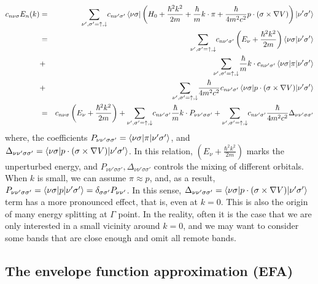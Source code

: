 \documentclass{article}
\begin{document}
\begin{eqnarray*}  c_{n \nu \sigma} E_n (k) & = & \underset{\nu', \sigma' = \uparrow,  \downarrow}{\sum} c_{n \nu' \sigma'} \bra{\nu \sigma} \left( H_0 + \frac{\hbar^2  k^2}{2 m} + \frac{\hbar}{m} k \cdot \pi + \frac{\hbar}{4 m^2 c^2} p \cdot  (\sigma \times \nabla V) \right) \ket{\nu' \sigma'}\\  & = & \underset{\nu', \sigma' = \uparrow, \downarrow}{\sum} c_{n \nu'  \sigma'} \left( E_{\nu} + \frac{\hbar^2 k^2}{2 m} \right) \braket{\nu \sigma |\nu'  \sigma'} \\  & + & \underset{\nu', \sigma' = \uparrow, \downarrow}{\sum} \frac{\hbar}{m}  k \cdot c_{n \nu' \sigma'} \braket{\nu \sigma |\pi|\nu' \sigma'}\\  & + & \underset{\nu', \sigma' = \uparrow, \downarrow}{\sum} \frac{\hbar}{4  m^2 c^2} c_{n \nu' \sigma'} \braket{\nu \sigma |p \cdot (\sigma \times \nabla V)|  \nu' \sigma'}\\  & = & c_{n \nu \sigma} \left( E_{\nu} + \frac{\hbar^2 k^2}{2 m} \right) +  \underset{\nu', \sigma' = \uparrow, \downarrow}{\sum} c_{n \nu' \sigma'}  \frac{\hbar}{m} k \cdot P_{\nu \nu' \sigma \sigma'} + \underset{\nu',  \sigma' = \uparrow, \downarrow}{\sum} c_{n \nu' \sigma'} \frac{\hbar}{4 m^2  c^2} \Delta_{\nu \nu' \sigma \sigma'}\end{eqnarray*}
where, the coefficients $P_{\nu \nu' \sigma \sigma'} = \braket{\nu \sigma |\pi|\nu'\sigma'}$, and $\Delta_{\nu \nu' \sigma \sigma'} = \braket{\nu \sigma |p \cdot (\sigma \times \nabla V)|\nu'\sigma'}$. In this relation, $\left( E_{\nu} + \frac{\hbar^2 k^2}{2 m} \right)$ marks the unperturbed energy, and $P_{\nu \nu' \sigma \sigma'}, \Delta_{\nu \nu' \sigma \sigma'}$ controls the mixing of different orbitals. When $k$ is small, we can assume $\pi\approx p$, and, as a result, $P_{\nu \nu' \sigma \sigma'} = \braket{\nu \sigma |p|\nu'\sigma'} = \delta_{\sigma \sigma'}P_{\nu \nu'}$. In this sense, $\Delta_{\nu \nu' \sigma \sigma'} = \braket{\nu \sigma |p \cdot (\sigma \times \nabla V)|\nu'\sigma'}$ term has a more pronounced effect, that is, even at $k=0$. This is also the origin of many energy splitting at $\Gamma$ point.
In the reality, often it is the case that we are only interested in a small vicinity around $k=0$, and we may want to consider some bands that are close enough and omit all remote bands.

\subsection{The envelope function approximation (EFA)}
\end{document}
